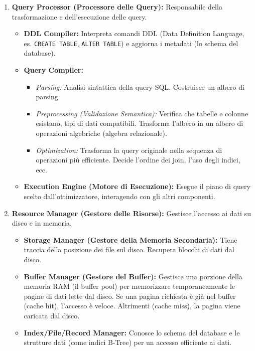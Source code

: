 \begin{enumerate}
    \item \textbf{Query Processor (Processore delle Query):} Responsabile della trasformazione e dell'esecuzione delle query.
    \begin{itemize}
        \item \textbf{DDL Compiler:} Interpreta comandi DDL (Data Definition Language, es. \texttt{CREATE TABLE}, \texttt{ALTER TABLE}) e aggiorna i metadati (lo schema del database).
        \item \textbf{Query Compiler:}
        \begin{itemize}
            \item \textit{Parsing:} Analisi sintattica della query SQL. Costruisce un albero di parsing.
            \item \textit{Preprocessing (Validazione Semantica):} Verifica che tabelle e colonne esistano, tipi di dati compatibili. Trasforma l'albero in un albero di operazioni algebriche (algebra relazionale).
            \item \textit{Optimization:} Trasforma la query originale nella sequenza di operazioni più efficiente. Decide l'ordine dei join, l'uso degli indici, ecc.
        \end{itemize}
        \item \textbf{Execution Engine (Motore di Esecuzione):} Esegue il piano di query scelto dall'ottimizzatore, interagendo con gli altri componenti.
    \end{itemize}

    \item \textbf{Resource Manager (Gestore delle Risorse):} Gestisce l'accesso ai dati su disco e in memoria.
    \begin{itemize}
        \item \textbf{Storage Manager (Gestore della Memoria Secondaria):} Tiene traccia della posizione dei file sul disco. Recupera blocchi di dati dal disco.
        \item \textbf{Buffer Manager (Gestore del Buffer):} Gestisce una porzione della memoria RAM (il buffer pool) per memorizzare temporaneamente le pagine di dati lette dal disco. Se una pagina richiesta è già nel buffer (cache hit), l'accesso è veloce. Altrimenti (cache miss), la pagina viene caricata dal disco.
        \item \textbf{Index/File/Record Manager:} Conosce lo schema del database e le strutture dati (come indici B-Tree) per un accesso efficiente ai dati.
    \end{itemize}


\end{enumerate}
